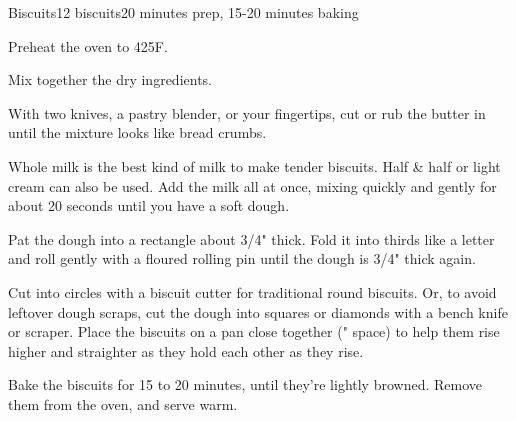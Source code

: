 \documentclass[../Cookbook.tex]{subfiles}
\begin{document}
\begin{recipe}{Biscuits}{12 biscuits}{20 minutes prep, 15-20 minutes baking}

Preheat the oven to 425\0F.


Mix together the dry ingredients.

With two knives, a pastry blender, or your fingertips, cut or rub the butter in until the mixture looks like bread crumbs.

Whole milk is the best kind of milk to make tender biscuits. Half \& half or light cream can also be used.
Add the milk all at once, mixing quickly and gently for about 20 seconds until you have a soft dough.

Pat the dough into a rectangle about 3/4" thick. Fold it into thirds like a letter and roll gently with a floured rolling pin until the dough is 3/4" thick again.

Cut into circles with a biscuit cutter for traditional round biscuits. Or, to avoid leftover dough scraps, cut the dough into squares or diamonds with a bench knife or scraper.
Place the biscuits on a pan close together (" space) to help them rise higher and straighter as they hold each other as they rise.

Bake the biscuits for 15 to 20 minutes, until they're lightly browned. Remove them from the oven, and serve warm.


\end{recipe}
\end{document}
